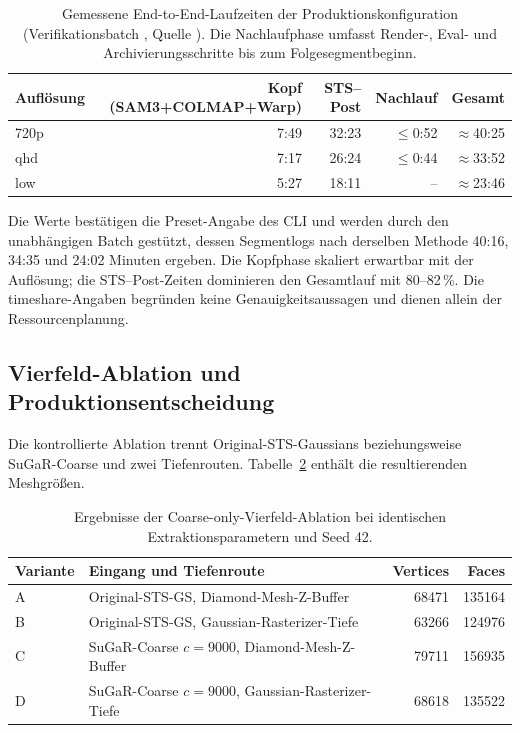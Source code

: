 \begin{table}[H]
\centering
\small
\begin{tabularx}{\textwidth}{lrrrr}
\toprule
Auflösung & Kopf (SAM3+COLMAP+Warp) & STS--Post & Nachlauf & Gesamt\\
\midrule
720p & 7:49 & 32:23 & $\le$0:52 & $\approx$40:25\\
qhd  & 7:17 & 26:24 & $\le$0:44 & $\approx$33:52\\
low  & 5:27 & 18:11 & --        & $\approx$23:46\\
\bottomrule
\end{tabularx}
\caption{Gemessene End-to-End-Laufzeiten der Produktionskonfiguration
(Verifikationsbatch , Quelle
). Die Nachlaufphase umfasst Render-, Eval- und
Archivierungsschritte bis zum Folgesegmentbeginn.}
\label{tab:e2e-laufzeiten}
\end{table}

Die Werte bestätigen die Preset-Angabe des CLI und werden durch den
unabhängigen Batch  gestützt, dessen
Segmentlogs nach derselben Methode 40:16, 34:35 und 24:02 Minuten ergeben. Die
Kopfphase skaliert erwartbar mit der Auflösung; die STS--Post-Zeiten dominieren
den Gesamtlauf mit 80--82\,\%. Die timeshare-Angaben begründen keine
Genauigkeitsaussagen und dienen allein der Ressourcenplanung.

\subsection{Vierfeld-Ablation und Produktionsentscheidung}

Die kontrollierte Ablation trennt Original-STS-Gaussians beziehungsweise
SuGaR-Coarse und zwei Tiefenrouten. Tabelle~\ref{tab:mesh-ablation} enthält die
resultierenden Meshgrößen.

\begin{table}[H]
\centering
\small
\begin{tabularx}{\textwidth}{lXrr}
\toprule
Variante & Eingang und Tiefenroute & Vertices & Faces\\
\midrule
A & Original-STS-GS, Diamond-Mesh-Z-Buffer & 68471 & 135164\\
B & Original-STS-GS, Gaussian-Rasterizer-Tiefe & 63266 & 124976\\
C & SuGaR-Coarse $c=9000$, Diamond-Mesh-Z-Buffer & 79711 & 156935\\
D & SuGaR-Coarse $c=9000$, Gaussian-Rasterizer-Tiefe & 68618 & 135522\\
\bottomrule
\end{tabularx}
\caption{Ergebnisse der Coarse-only-Vierfeld-Ablation bei identischen
Extraktionsparametern und Seed 42.}
\label{tab:mesh-ablation}
\end{table}

